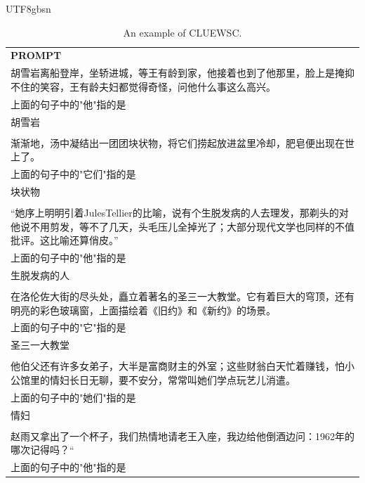 \documentclass[11pt, a4paper, logo, copyright, nonumbering]{deepseek}
\begin{document}
\begin{CJK*}{UTF8}{gbsn}
\begin{table}[h]
    \centering \small
\begin{tabular}{p{12cm}}
\toprule
\textbf{PROMPT}\\
胡雪岩离船登岸，坐轿进城，等王有龄到家，他接着也到了他那里，脸上是掩抑不住的笑容，王有龄夫妇都觉得奇怪，问他什么事这么高兴。
\\上面的句子中的"他"指的是
\\胡雪岩
\\
\\渐渐地，汤中凝结出一团团块状物，将它们捞起放进盆里冷却，肥皂便出现在世上了。
\\上面的句子中的"它们"指的是
\\块状物
\\
\\“她序上明明引着JulesTellier的比喻，说有个生脱发病的人去理发，那剃头的对他说不用剪发，等不了几天，头毛压儿全掉光了；大部分现代文学也同样的不值批评。这比喻还算俏皮。”
\\上面的句子中的"他"指的是
\\生脱发病的人
\\
\\在洛伦佐大街的尽头处，矗立着著名的圣三一大教堂。它有着巨大的穹顶，还有明亮的彩色玻璃窗，上面描绘着《旧约》和《新约》的场景。
\\上面的句子中的"它"指的是
\\圣三一大教堂
\\
\\他伯父还有许多女弟子，大半是富商财主的外室；这些财翁白天忙着赚钱，怕小公馆里的情妇长日无聊，要不安分，常常叫她们学点玩艺儿消遣。
\\上面的句子中的"她们"指的是
\\情妇
\\
\\赵雨又拿出了一个杯子，我们热情地请老王入座，我边给他倒酒边问：1962年的哪次记得吗？“
\\上面的句子中的"他"指的是\\
\bottomrule
\end{tabular}
    \caption{\centering An example of CLUEWSC.}
    \label{tab:cluewsc_eval_format_example}
\end{table}


\end{CJK*}
\end{document}
